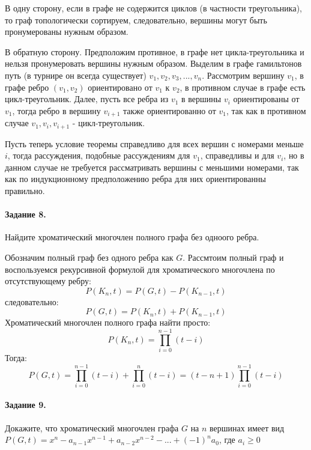 \documentclass[a4paper,12pt]{article}
\begin{document}
\begin{Solution}
В одну сторону, если в графе не содержится циклов (в частности треугольника), то граф топологически сортируем, следовательно, вершины могут быть пронумерованы нужным образом.

В обратную сторону. Предположим противное, в графе нет цикла-треугольника и нельзя пронумеровать вершины нужным образом. Выделим в графе гамильтонов путь (в турнире он всегда существует) $v_1, v_2, v_3, ..., v_n$. Рассмотрим вершину $v_1$, в графе ребро $(v_1,v_2)$ ориентировано от $v_1$ к $v_2$, в противном случае в графе есть цикл-треугольник. Далее, пусть все ребра из $v_1$ в вершины $v_i$ ориентированы от $v_1$, тогда ребро в вершину $v_{i+1}$ также ориентированно от $v_1$, так как в противном случае $v_1, v_i, v_{i+1}$ - цикл-треугольник.

Пусть теперь условие теоремы справедливо для всех вершин с номерами меньше $i$, тогда рассуждения, подобные рассуждениям для $v_1$, справедливы и для $v_i$, но в данном случае не требуется рассматривать вершины с меньшими номерами, так как по индукционному предположению ребра для них ориентированны правильно.
\end{Solution}

\paragraph{Задание 8.} Найдите хроматический многочлен полного графа без одноого ребра.

\begin{Solution}
Обозначим полный граф без одного ребра как $G$. Рассмтоим полный граф и воспользуемся рекурсивной формулой для хроматического многочлена по отсутствующему ребру:
\[
	P\left(K_n,t\right) = P\left(G, t\right) - P\left(K_{n-1},t\right)
\]
следовательно:
\[
	P\left(G, t\right) = P\left(K_n,t\right) + P\left(K_{n-1},t\right)
\]
Хроматический многочлен полного графа найти просто:
\[
	P\left(K_n,t\right) = \prod_{i=0}^{n-1} \left(t-i\right)
\]
Тогда:
\[
	P\left(G, t\right) = \prod_{i=0}^{n-1} \left(t-i\right) + \prod_{i=0}^n \left(t-i\right) = \left(t-n+1\right) \prod_{i=0}^{n-1} \left(t-i\right)
\]
\end{Solution}

\paragraph{Задание 9.} Докажите, что хроматический многочлен графа $G$ на $n$ вершинах имеет вид $P\left(G,t\right) = x^n - a_{n-1} x^{n-1} + a_{n-2} x^{n-2} - ... + \left(-1\right)^n a_0$, где $a_i \ge 0$
\end{document}
